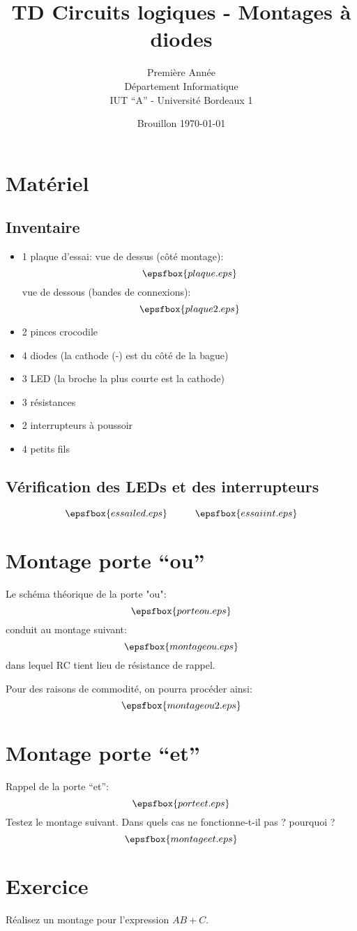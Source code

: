 \documentclass[]{article}
\title{
TD Circuits logiques - Montages \`a diodes}
\author{Première Année \\        Département Informatique \\
        IUT ``A'' - Université Bordeaux 1}
\date{Brouillon \today}
\begin{document}
\maketitle

\section{Matériel}

\subsection{Inventaire}
\begin{itemize}
\item 1 plaque d'essai: vue de dessus (côté montage):
$$ \epsfbox{plaque.eps}$$
vue de dessous (bandes de connexions):
$$ \epsfbox{plaque2.eps}$$

\item 2 pinces crocodile
\item 4 diodes (la cathode (-) est du côté de la bague)
\item 3 LED (la broche la plus courte est la cathode)
\item 3 résistances
\item 2 interrupteurs à poussoir
\item 4 petits fils
\end{itemize}

\subsection{Vérification  des LEDs et des interrupteurs}

$$\epsfbox{essailed.eps} \hspace{1cm} \epsfbox{essaiint.eps}$$

\section{Montage porte ``ou''}

Le schéma théorique de la porte "ou":
$$\epsfbox{porteou.eps}$$
conduit au montage suivant:
$$\epsfbox{montageou.eps}$$
dans lequel RC tient lieu de résistance de rappel.

Pour des raisons de commodité, on pourra procéder ainsi:
$$\epsfbox{montageou2.eps}$$


\section{Montage porte ``et''}

Rappel de la porte ``et'':
$$\epsfbox{porteet.eps}$$
Testez le montage suivant. Dans quels cas ne fonctionne-t-il
pas ? pourquoi ?
$$\epsfbox{montageet.eps}$$


\section{Exercice}
Réalisez un montage pour l'expression $AB+C$.
\end{document}
